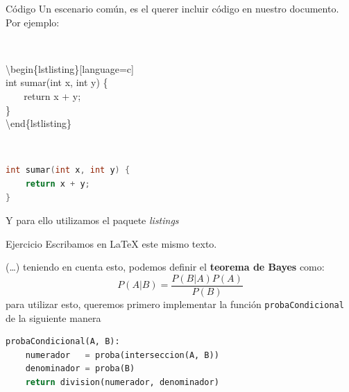 \begin{frame}[fragile]{Código}
Un escenario común, es el querer incluir código en nuestro documento. Por ejemplo:

\

\textbackslash begin\{lstlisting\}[language=c] \\
int sumar(int x, int y) \{ \\
$~~~~~~~$ return x + y; \\
\} \\
\textbackslash end\{lstlisting\}

\

\begin{lstlisting}[language=c]
int sumar(int x, int y) {
    return x + y;
}
\end{lstlisting}

Y para ello utilizamos el paquete \emph{listings}

\end{frame}

\begin{frame}[fragile]{Ejercicio}
    Escribamos en \LaTeX{}  este mismo texto. 
    
    \begin{tcolorbox}[colframe=color1]
        (\ldots) teniendo en cuenta esto, podemos definir el \textbf{teorema de Bayes} como:
        \[P(A|B) = \frac{P(B|A)P(A)}{P(B)}\]
        para utilizar esto, queremos primero implementar la función \texttt{probaCondicional} de la siguiente manera
\begin{lstlisting}[language=python]
probaCondicional(A, B):
    numerador   = proba(interseccion(A, B))
    denominador = proba(B)       
    return division(numerador, denominador)
\end{lstlisting}
\end{tcolorbox}
    
\end{frame}

